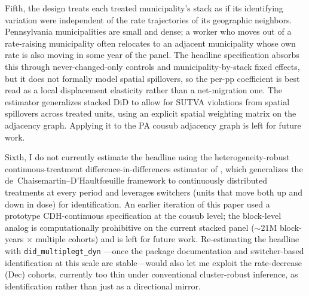 \documentclass[12pt]{article}
\begin{document}
Fifth, the design treats each treated municipality's stack as if
its identifying variation were independent of the rate trajectories
of its geographic neighbors. Pennsylvania municipalities are small
and dense; a worker who moves out of a rate-raising municipality often
relocates to an adjacent municipality whose own rate is also moving in some
year of the panel. The headline specification absorbs this through
never-changed-only controls and municipality-by-stack fixed effects, but it
does not formally model spatial spillovers, so the per-pp
coefficient is best read as a local displacement elasticity rather
than a net-migration one. The
\citet{buttsDifferenceinDifferencesEstimationSpatial2023} estimator generalizes stacked
DiD to allow for SUTVA violations from spatial spillovers across
treated units, using an explicit spatial weighting matrix on the
adjacency graph. Applying it to the PA cousub adjacency graph is
left for future work.

Sixth, I do not currently estimate the headline using the
heterogeneity-robust continuous-treatment difference-in-differences
estimator of \citet{dechaisemartinDifferenceinDifferencesEstimatorsTreatments2022}, which generalizes
the de~Chaisemartin--D'Haultf{\oe}uille framework
\citep{dechaisemartinTwoWayFixedEffects2020, dechaisemartinTwoWayFixedEffects2023} to
continuously distributed treatments at every period and leverages
switchers (units that move both up and down in dose) for
identification. An earlier iteration of this paper used a
prototype CDH-continuous specification at the cousub level; the
block-level analog is computationally prohibitive on the current
stacked panel ($\sim 21$M block-years $\times$ multiple cohorts) and
is left for future work. Re-estimating the headline with
\texttt{did\_multiplegt\_dyn}
\citep{chaisemartinUsingDid_multiplegt_dynEstimate2025}---once the package
documentation and switcher-based identification at this scale are
stable---would also let me exploit the rate-decrease (Dec)
cohorts, currently too thin under conventional cluster-robust
inference, as identification rather than just as a directional
mirror.
\end{document}
